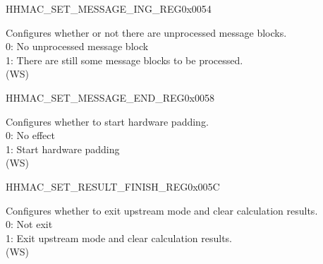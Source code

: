     \begin{register}{H}{HMAC\_SET\_MESSAGE\_ING\_REG}{0x0054}\label{regdesc:HMACSETMESSAGEINGREG}
    \regnewline%
    \begin{regdesc}\begin{reglist}
    \label{fielddesc:HMACSETTEXTING}\item [HMAC\_SET\_TEXT\_ING] Configures whether or not there are unprocessed message blocks.
    \\0: No unprocessed message block
    \\1: There are still some message blocks to be processed.
    \\(WS)
    \end{reglist}\end{regdesc}
    \end{register}


    \begin{register}{H}{HMAC\_SET\_MESSAGE\_END\_REG}{0x0058}\label{regdesc:HMACSETMESSAGEENDREG}
    \regnewline%
    \begin{regdesc}\begin{reglist}
    \label{fielddesc:HMACSETTEXTEND}\item [HMAC\_SET\_TEXT\_END] Configures whether to start hardware padding.
    \\0: No effect
    \\1: Start hardware padding
    \\(WS)
    \end{reglist}\end{regdesc}
    \end{register}


    \begin{register}{H}{HMAC\_SET\_RESULT\_FINISH\_REG}{0x005C}\label{regdesc:HMACSETRESULTFINISHREG}
    \regnewline%
    \begin{regdesc}\begin{reglist}
    \label{fielddesc:HMACSETRESULTEND}\item [HMAC\_SET\_RESULT\_END] Configures whether to exit upstream mode and clear calculation results.
    \\0: Not exit
    \\1: Exit upstream mode and clear calculation results.
    \\(WS)
    \end{reglist}\end{regdesc}
    \end{register}


